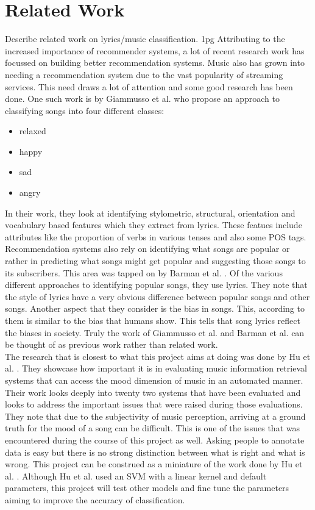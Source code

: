 \documentclass[11pt,a4paper]{article}
\begin{document}
\section{Related Work}
\label{relatedwork}
Describe related work on lyrics/music classification. 1pg
Attributing to the increased importance of recommender systems, a lot of recent research work has focussed on building better recommendation systems. Music also has grown into needing a recommendation system due to the vast popularity of streaming services. This need draws a lot of attention and some good research has been done. One such work is by Giammusso et al. \cite{giammussopredicting} who propose an approach to classifying songs into four different classes:
\begin{itemize}
  \item relaxed
  \item happy
  \item sad
  \item angry
\end{itemize}
In their work, they look at identifying stylometric, structural, orientation and vocabulary based features which they extract from lyrics. These featues include attributes like the proportion of verbs in various tenses and also some POS tags.\\
Recommendation systems also rely on identifying what songs are popular or rather in predicting what songs might get popular and suggesting those songs to its subscribers. This area was tapped on by Barman et al. \cite{barman2019decoding}. Of the various different approaches to identifying popular songs, they use lyrics. They note that the style of lyrics have a very obvious difference between popular songs and other songs. Another aspect that they consider is the bias in songs. This, according to them is similar to the bias that humans show. This tells that song lyrics reflect the biases in society. Truly the work of Giammusso et al.\cite{giammussopredicting} and Barman et al. \cite{barman2019decoding} can be thought of as previous work rather than related work.\\
The research that is closest to what this project aims at doing was done by Hu et al. \cite{hu2009lyric}. They showcase how important it is in evaluating music information retrieval systems that can access the mood dimension of music in an automated manner. Their work looks deeply into twenty two systems that have been evaluated and looks to address the important issues that were raised during those evaluations. They note that due to the subjectivity of music perception, arriving at a ground truth for the mood of a song can be difficult. This is one of the issues that was encountered during the course of this project as well. Asking people to annotate data is easy but there is no strong distinction between what is right and what is wrong. This project can be construed as a miniature of the work done by Hu et al. \cite{hu2009lyric}. Although Hu et al. \cite{hu2009lyric} used an SVM with a linear kernel and default parameters, this project will test other models and fine tune the parameters aiming to improve the accuracy of classification.\\
\end{document}
